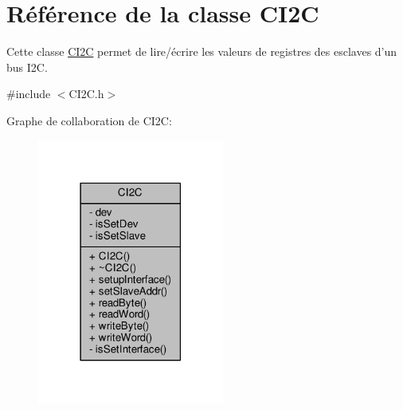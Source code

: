 \hypertarget{classCI2C}{\section{Référence de la classe C\+I2\+C}
\label{classCI2C}
}


Cette classe \hyperlink{classCI2C}{C\+I2\+C} permet de lire/écrire les valeurs de registres des esclaves d'un bus I2\+C.  




{\ttfamily \#include $<$C\+I2\+C.\+h$>$}



Graphe de collaboration de C\+I2\+C\+:\nopagebreak
\begin{figure}[H]
\begin{center}
\leavevmode
\includegraphics[width=174pt]{classCI2C__coll__graph}
\end{center}
\end{figure}
